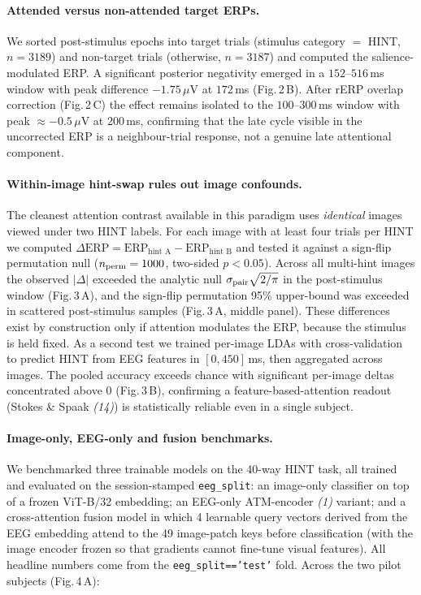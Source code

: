 \documentclass[12pt]{article}
\begin{document}
\paragraph*{Attended versus non-attended target ERPs.}
We sorted post-stimulus epochs into target trials (stimulus
category $=$ HINT, $n=3189$) and non-target trials (otherwise,
$n=3187$) and computed the salience-modulated ERP.  A significant
posterior negativity emerged in a $152$--$516$\,ms window with peak
difference $-1.75$\,$\mu$V at $172$\,ms (Fig.\,2\,B).  After
rERP overlap correction (Fig.\,2\,C) the effect remains isolated to
the $100$--$300$\,ms window with peak $\approx -0.5$\,$\mu$V at
$200$\,ms, confirming that the late cycle visible in the
uncorrected ERP is a neighbour-trial response, not a genuine
late attentional component.

\paragraph*{Within-image hint-swap rules out image confounds.}
The cleanest attention contrast available in this paradigm uses
\textit{identical} images viewed under two HINT labels.  For each
image with at least four trials per HINT we computed
$\Delta\mbox{ERP} = \mbox{ERP}_{\mbox{hint A}} - \mbox{ERP}_{\mbox{hint B}}$
and tested it against a sign-flip permutation null
($n_{\rm perm}=1000$, two-sided $p<0.05$).  Across all
multi-hint images the observed $|\Delta|$ exceeded the analytic
null $\sigma_{\rm pair}\sqrt{2/\pi}$ in the post-stimulus window
(Fig.\,3\,A), and the sign-flip permutation 95\%
upper-bound was exceeded in scattered post-stimulus samples
(Fig.\,3\,A, middle panel).  These differences exist by
construction only if attention modulates the ERP, because the
stimulus is held fixed.  As a second test we trained per-image
LDAs with cross-validation to predict HINT from EEG features in
$[0,450]$\,ms, then aggregated across images.  The pooled accuracy
exceeds chance with significant per-image deltas concentrated
above $0$ (Fig.\,3\,B), confirming a feature-based-attention
readout (Stokes \& Spaak \textit{(14)}) is statistically reliable
even in a single subject.

\paragraph*{Image-only, EEG-only and fusion benchmarks.}
We benchmarked three trainable models on the 40-way HINT task,
all trained and evaluated on the session-stamped
\texttt{eeg\_split}: an image-only classifier on top of a frozen
ViT-B/32 embedding; an EEG-only ATM-encoder
\textit{(1)} variant; and a cross-attention fusion model in
which 4 learnable query vectors derived from the EEG embedding
attend to the 49 image-patch keys before classification (with
the image encoder frozen so that gradients cannot fine-tune
visual features).  All headline numbers come from the
\texttt{eeg\_split=='test'} fold.  Across the two pilot subjects
(Fig.\,4\,A):
\end{document}
